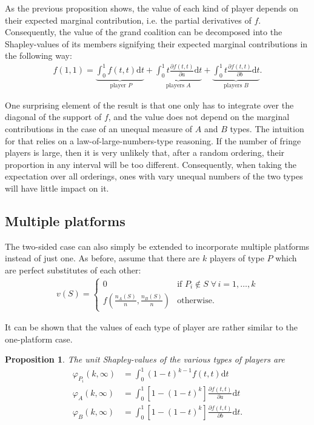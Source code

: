 \documentclass[a4paper]{article}
\newtheorem{proposition}{Proposition}
\newcommand{\dt}{\mathrm{d}t}
\begin{document}
As the previous proposition shows, the value of each kind of player depends on their expected marginal contribution, i.e. the partial derivatives of $f$. Consequently, the value of the grand coalition can be decomposed into the Shapley-values of its members signifying their expected marginal contributions in the following way:
\begin{align*}
    f(1, 1) = \underbrace{\int_0^1 f(t, t) \dt}_{\text{ player } P} + \underbrace{\int_0^1 t \frac{\partial f(t, t)}{\partial a} \dt}_{\text{players } A} + \underbrace{\int_0^1 t \frac{\partial f(t, t)}{\partial b} \dt}_{\text{players } B}.
\end{align*}

One surprising element of the result is that one only has to integrate over the diagonal of the support  of $f$, and the value does not depend on the marginal contributions in the case of an unequal measure of $A$ and $B$ types. The intuition for that relies on a law-of-large-numbers-type reasoning. If the number of fringe players is large, then it is very unlikely that, after a random ordering, their proportion in any interval will be too different. Consequently, when taking the expectation over all orderings, ones with vary unequal numbers of the two types will have little impact on it.


\subsection{Multiple platforms}

The two-sided case can also simply be extended to incorporate multiple platforms instead of just one. As before, assume that there are $k$ players of type $P$ which are perfect substitutes of each other:
\begin{align*}
    v(S) = \begin{cases}
        0                                                & \text{if } P_i \notin S \; \forall \, i = 1, \dots, k \\
        f\left(\frac{n_A(S)}{n}, \frac{n_B(S)}{n}\right) & \text{otherwise}.
    \end{cases}
\end{align*}

It can be shown that the values of each type of player are rather similar to the one-platform case.
\begin{proposition}
    The unit Shapley-values of the various types of players are
    \begin{align*}
        \varphi_{P_i}(k, \infty) & = \int_0^1 (1-t)^{k-1} f(t, t) \dt                                 \\
        \varphi_A(k, \infty)     & = \int_0^1 [1 - (1-t)^k] \frac{\partial f(t, t)}{\partial a} \dt   \\
        \varphi_B(k, \infty)     & = \int_0^1 [1 - (1-t)^k] \frac{\partial f(t, t)}{\partial b} \dt .
    \end{align*}
\end{proposition}
\end{document}

